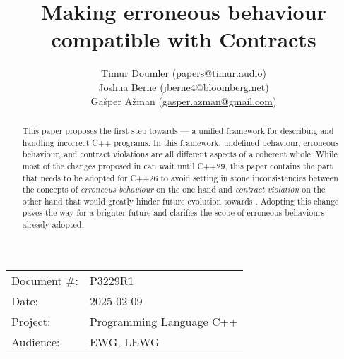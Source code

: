 \title{Making erroneous behaviour compatible with Contracts}
\author{
Timur Doumler \small(\href{mailto:papers@timur.audio}{papers@timur.audio}) \\
Joshua Berne \small(\href{mailto:jberne4@bloomberg.net}{jberne4@bloomberg.net}) \\
Ga\v sper A\v zman \small(\href{mailto:gasper.azman@gmail.com}{gasper.azman@gmail.com}) \\
}
\date{}
\maketitle


\begin{tabular}{ll}
Document \#: & P3229R1 \\
Date: &2025-02-09 \\
Project: & Programming Language C++ \\
Audience: & EWG, LEWG
\end{tabular}


\begin{abstract}
This paper proposes the first step towards \cite{P3100R1} --- a unified framework for describing and handling incorrect C++ programs. In this framework, undefined behaviour, erroneous behaviour, and contract violations are all different aspects of a coherent whole. While most of the changes proposed in \cite{P3100R1} can wait until C++29, this paper contains the part that needs to be adopted for C++26 to avoid setting in stone inconsistencies between the concepts of \emph{erroneous behaviour} on the one hand and \emph{contract violation} on the other hand that would greatly hinder future evolution towards \cite{P3100R1}.  Adopting this change paves the way for a brighter future and clarifies the scope of erroneous behaviours already adopted.
\end{abstract}





